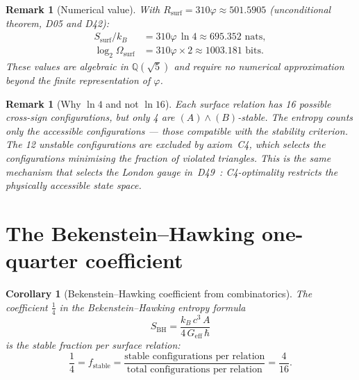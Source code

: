 \documentclass[12pt,a4paper]{article}
\newtheorem{corollary}[theorem]{Corollary}
\newtheorem{remark}[theorem]{Remark}
\newcommand{\hb}{\hbar}
\newcommand{\Rsurf}{R_{\mathrm{surf}}}
\newcommand{\Omegasurf}{\Omega_{\mathrm{surf}}}
\newcommand{\Ssurf}{S_{\mathrm{surf}}}
\newcommand{\SBH}{S_{\mathrm{BH}}}
\newcommand{\vp}{\varphi}
\begin{document}
\begin{remark}[Numerical value]
With $\Rsurf = 310\vp \approx 501.5905$ (unconditional theorem, D05 and D42):
\begin{align}
\Ssurf/k_B &= 310\vp\,\ln 4 \approx 695.352 \text{ nats},\\
\log_2\Omegasurf &= 310\vp \times 2 \approx 1003.181 \text{ bits}.
\end{align}
These values are algebraic in $\mathbb{Q}(\sqrt{5})$ and require no numerical approximation beyond the finite representation of $\vp$.
\end{remark}

\begin{remark}[Why $\ln 4$ and not $\ln 16$]
Each surface relation has 16 possible cross-sign configurations, but only 4 are $(A)\wedge(B)$-stable. The entropy counts only the \emph{accessible} configurations — those compatible with the stability criterion. The 12 unstable configurations are excluded by axiom~C4, which selects the configurations minimising the fraction of violated triangles. This is the same mechanism that selects the London gauge in~D49~\cite{PDL_D49_2026}: C4-optimality restricts the physically accessible state space.
\end{remark}

\section{The Bekenstein--Hawking one-quarter coefficient}
\label{sec:BH}

\begin{corollary}[Bekenstein--Hawking coefficient from combinatorics]
\label{cor:BH}
The coefficient $\tfrac{1}{4}$ in the Bekenstein--Hawking entropy formula
\begin{equation}
\SBH = \frac{k_B\,c^3\,A}{4\,G_{\mathrm{eff}}\,\hb}
\label{eq:BH_standard}
\end{equation}
is the stable fraction per surface relation:
\begin{equation}
\frac{1}{4} = f_{\mathrm{stable}} = \frac{\text{stable configurations per relation}}{\text{total configurations per relation}} = \frac{4}{16}.
\label{eq:quarter_identification}
\end{equation}
\end{corollary}
\end{document}
